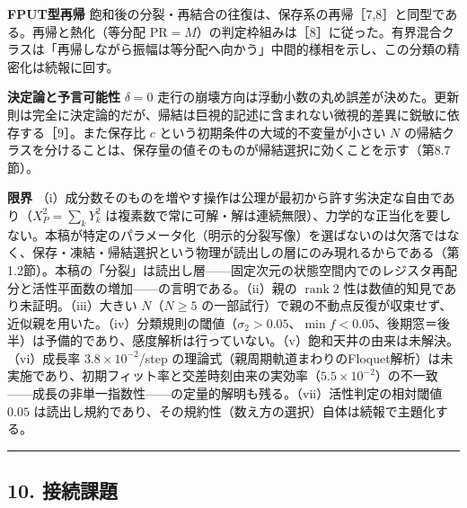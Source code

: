 \documentclass[
  a4paper,
]{ltjsarticle}
\begin{document}
\textbf{FPUT型再帰}
飽和後の分裂・再結合の往復は、保存系の再帰［7,8］と同型である。再帰と熱化（等分配
\(\mathrm{PR}=M\)）の判定枠組みは［8］に従った。有界混合クラスは「再帰しながら振幅は等分配へ向かう」中間的様相を示し、この分類の精密化は続報に回す。

\textbf{決定論と予言可能性} \(\delta=0\)
走行の崩壊方向は浮動小数の丸め誤差が決めた。更新則は完全に決定論的だが、帰結は巨視的記述に含まれない微視的差異に鋭敏に依存する［9］。また保存比
\(c\) という初期条件の大域的不変量が小さい \(N\)
の帰結クラスを分けることは、保存量の値そのものが帰結選択に効くことを示す（第8.7節）。

\textbf{限界}
（i）成分数そのものを増やす操作は公理が最初から許す劣決定な自由であり（\(X_P^2=\sum_kY_k^2\)
は複素数で常に可解・解は連続無限）、力学的な正当化を要しない。本稿が特定のパラメータ化（明示的分裂写像）を選ばないのは欠落ではなく、保存・凍結・帰結選択という物理が読出しの層にのみ現れるからである（第1.2節）。本稿の「分裂」は読出し層------固定次元の状態空間内でのレジスタ再配分と活性平面数の増加------の言明である。（ii）親の
\(\operatorname{rank}2\) 性は数値的知見であり未証明。（iii）大きい
\(N\)（\(N\ge5\)
の一部試行）で親の不動点反復が収束せず、近似親を用いた。（iv）分類規則の閾値（\(\sigma_2>0.05\)、\(\min f<0.05\)、後期窓＝後半）は予備的であり、感度解析は行っていない。（v）飽和天井の由来は未解決。（vi）成長率
\(3.8\times10^{-2}\)/step
の理論式（親周期軌道まわりのFloquet解析）は未実施であり、初期フィット率と交差時刻由来の実効率（\(5.5\times10^{-2}\)）の不一致------成長の非単一指数性------の定量的解明も残る。（vii）活性判定の相対閾値
\(0.05\)
は読出し規約であり、その規約性（数え方の選択）自体は続報で主題化する。

\begin{center}\rule{0.5\linewidth}{0.5pt}\end{center}

\subsection{10. 接続課題}\label{ux63a5ux7d9aux8ab2ux984c}
\end{document}

